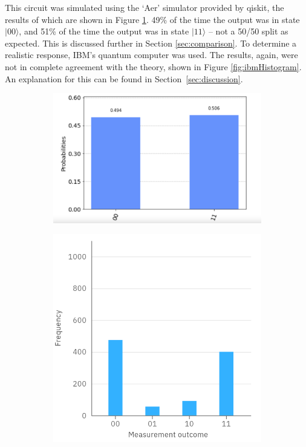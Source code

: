 This circuit was simulated using the `Aer' simulator provided by qiskit, the results of which are shown in Figure \ref{fig:qiskitHistogram}. 49\% of the time the output was in state $|00\rangle$, and 51\% of the time the output was in state $|11\rangle$ -- not a 50/50 split as expected. This is discussed further in Section \ref{sec:comparison}. To determine a realistic response, IBM's quantum computer was used. The results, again, were not in complete agreement with the theory, shown in Figure \ref{fig:ibmHistogram}. An explanation for this can be found in Section~\ref{sec:discussion}.

\begin{figure}[H]
    \centering
    \begin{subfigure}[h]{0.5\textwidth}
        \includegraphics[width=\textwidth]{lab2/images/qiskitHistogram.png}
        \caption{} 
        \label{fig:qiskitHistogram}
    \end{subfigure}
    \hfill
    \begin{subfigure}[h]{0.43\textwidth}
        \includegraphics[width=\textwidth]{lab2/images/ibmHistogram.png}

\end{subfigure}
\end{figure}
